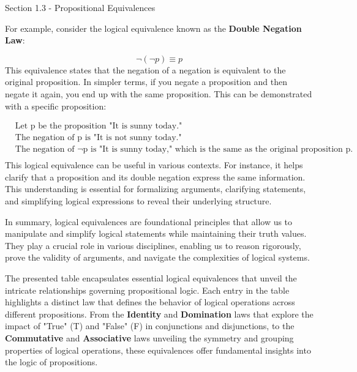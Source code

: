 \begin{notes}{Section 1.3 - Propositional Equivalences}
    \begin{highlight}
        For example, consider the logical equivalence known as the \textbf{Double Negation Law}:

        \begin{equation*}
            \neg(\neg p) \equiv p
        \end{equation*}
        This equivalence states that the negation of a negation is equivalent to the original proposition. In simpler terms, if you negate a proposition and then negate it again, you end up with the same 
        proposition. This can be demonstrated with a specific proposition:

        \begin{align*}
            & \text{Let p be the proposition "It is sunny today."} \\
            & \text{The negation of p is "It is not sunny today."} \\
            & \text{The negation of $\neg$p is "It is sunny today," which is the same as the original proposition p.} \\
        \end{align*}
        This logical equivalence can be useful in various contexts. For instance, it helps clarify that a proposition and its double negation express the same information. This understanding is essential 
        for formalizing arguments, clarifying statements, and simplifying logical expressions to reveal their underlying structure.
    \end{highlight}

    In summary, logical equivalences are foundational principles that allow us to manipulate and simplify logical statements while maintaining their truth values. They play a crucial role in various disciplines, 
    enabling us to reason rigorously, prove the validity of arguments, and navigate the complexities of logical systems.

    The presented table encapsulates essential logical equivalences that unveil the intricate relationships governing propositional logic. Each entry in the table highlights a distinct law that defines the behavior 
    of logical operations across different propositions. From the \textbf{Identity} and \textbf{Domination} laws that explore the impact of "True" (T) and "False" (F) in conjunctions and disjunctions, to the 
    \textbf{Commutative} and \textbf{Associative} laws unveiling the symmetry and grouping properties of logical operations, these equivalences offer fundamental insights into the logic of propositions.


\end{notes}
